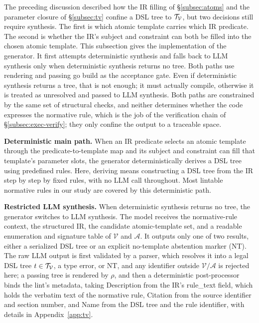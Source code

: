 The preceding discussion described how the IR filling of \S\ref{subsec:atoms} and the
parameter closure of \S\ref{subsec:tv} confine a DSL tree to $\mathcal{T}_{\mathcal{V}}$, but two
decisions still require synthesis. The first is which atomic template carries
which IR predicate. The second is whether the IR's subject and
constraint can both be filled into the chosen atomic template.
This subsection gives the implementation of the generator. It
first attempts deterministic synthesis and falls back to LLM synthesis only when
deterministic synthesis returns no tree. Both paths use rendering and passing go build as
the acceptance gate. Even if deterministic synthesis returns a tree, that is
not enough; it must actually compile, otherwise it is treated as unresolved and
passed to LLM synthesis. Both paths are constrained by the same set of
structural checks, and neither determines whether the code expresses the
normative rule, which is the job of the verification chain of
\S\ref{subsec:exec-verify}; they only confine the output to a traceable space.

\textbf{Deterministic main path.} When an IR predicate selects an atomic
template through the predicate-to-template map and its subject and constraint can fill that template's
parameter slots, the generator deterministically derives a DSL tree using
predefined rules. Here, deriving means constructing a DSL tree from the IR step by
step by fixed rules, with no LLM call throughout. Most lintable normative rules in our
study are covered by this deterministic path.

\textbf{Restricted LLM synthesis.} When deterministic synthesis returns no tree,
the generator switches to LLM synthesis. The model receives the normative-rule context,
the structured IR, the candidate atomic-template set, and a readable enumeration
and signature table of $\mathcal{V}$ and $\mathcal{A}$. It
outputs only one of two results, either a serialized DSL tree or an explicit
no-template abstention marker (NT). The raw LLM
output is first validated by a parser, which resolves it into
a legal DSL tree $t \in \mathcal{T}_{\mathcal{V}}$, a type error, or NT, and any
identifier outside $\mathcal{V}/\mathcal{A}$ is rejected here; a passing tree is
rendered by $\rho$, and then a deterministic post-processor
binds the lint's metadata, taking Description from the IR's rule\_text field,
which holds the verbatim text of the normative rule, Citation from the source
identifier and section number, and Name from the DSL tree and the rule
identifier, with details in Appendix~\ref{app:tv}.

